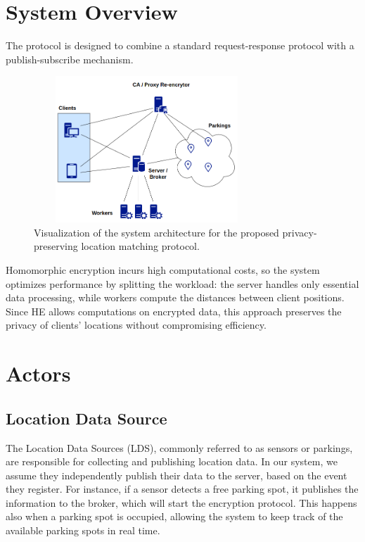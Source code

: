 \section{System Overview}
The protocol is designed to combine a standard request-response protocol with a publish-subscribe mechanism.


\begin{figure}[h]
    \centering
    \includegraphics[width=8.5cm,height=5.5cm]{img/architecture-scheme.png}
    \caption{Visualization of the system architecture for the proposed privacy-preserving location matching protocol.}
    \label{fig:architecture}
\end{figure}

Homomorphic encryption incurs high computational costs, so the system optimizes performance by splitting the workload: the server handles only essential data processing, while workers compute the distances between client positions. Since HE allows computations on encrypted data, this approach preserves the privacy of clients' locations without compromising efficiency.

\section{Actors}

\subsection{Location Data Source}
The Location Data Sources (LDS), commonly referred to as sensors or parkings, are responsible for collecting and publishing location data. In our system, we assume they independently publish their data to the server, based on the event they register. For instance, if a sensor detects a free parking spot, it publishes the information to the broker, which will start the encryption protocol. This happens also when a parking spot is occupied, allowing the system to keep track of the available parking spots in real time.

